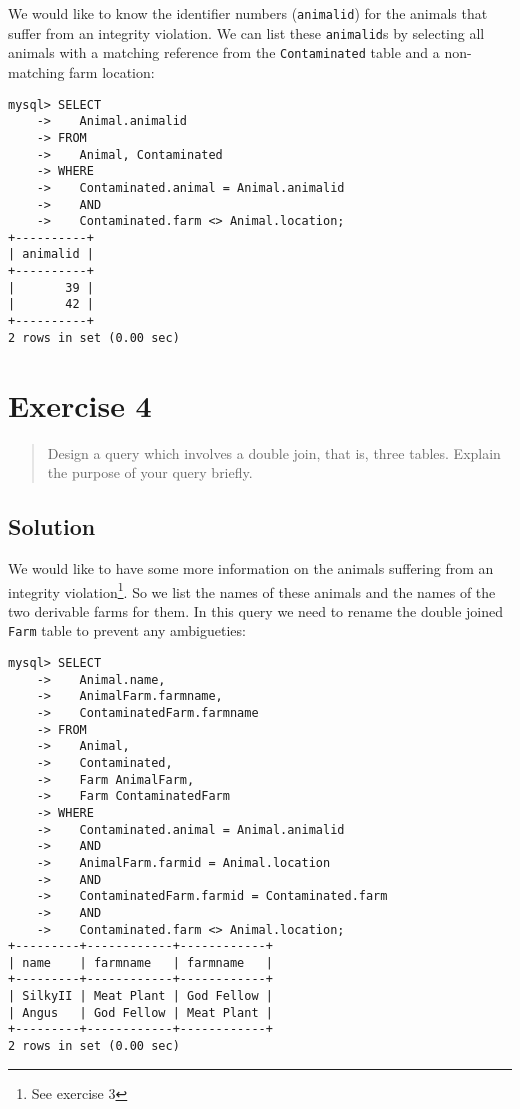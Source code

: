 \documentclass[11pt]{article}
\begin{document}
We would like to know the identifier numbers (\verb|animalid|) for the animals that suffer from an integrity violation. We can list these \verb|animalid|s by selecting all animals with a matching reference from the \verb|Contaminated| table and a non-matching farm location:

\begin{verbatim}
mysql> SELECT
    ->    Animal.animalid
    -> FROM
    ->    Animal, Contaminated
    -> WHERE
    ->    Contaminated.animal = Animal.animalid
    ->    AND
    ->    Contaminated.farm <> Animal.location;
+----------+
| animalid |
+----------+
|       39 |
|       42 |
+----------+
2 rows in set (0.00 sec)
\end{verbatim}


\newpage

\section{Exercise 4}

\begin{quote}
Design a query which involves a double join, that is, three tables. Explain the purpose of your query briefly.
\end{quote}

\subsection*{Solution}

We would like to have some more information on the animals suffering from an integrity violation\footnote{See exercise 3}. So we list the names of these animals and the names of the two derivable farms for them. In this query we need to rename the double joined \verb|Farm| table to prevent any ambigueties:

\begin{verbatim}
mysql> SELECT
    ->    Animal.name,
    ->    AnimalFarm.farmname,
    ->    ContaminatedFarm.farmname
    -> FROM
    ->    Animal,
    ->    Contaminated,
    ->    Farm AnimalFarm,
    ->    Farm ContaminatedFarm
    -> WHERE
    ->    Contaminated.animal = Animal.animalid
    ->    AND
    ->    AnimalFarm.farmid = Animal.location
    ->    AND
    ->    ContaminatedFarm.farmid = Contaminated.farm
    ->    AND
    ->    Contaminated.farm <> Animal.location;
+---------+------------+------------+
| name    | farmname   | farmname   |
+---------+------------+------------+
| SilkyII | Meat Plant | God Fellow |
| Angus   | God Fellow | Meat Plant |
+---------+------------+------------+
2 rows in set (0.00 sec)
\end{verbatim}
\end{document}
